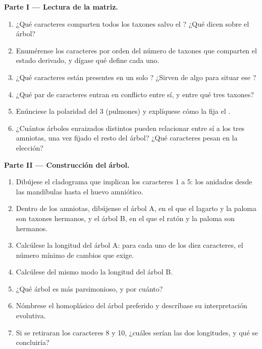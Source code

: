 \begin{problem}
\medskip
\noindent\textbf{Parte I --- Lectura de la matriz.}
\begin{enumerate}
  \item ¿Qué caracteres comparten todos los taxones salvo el ?
        ¿Qué dicen sobre el árbol?
  \item Enumérense los caracteres por orden del número de taxones que
        comparten el estado derivado, y dígase qué  define cada uno.
  \item ¿Qué caracteres están presentes en un solo ? ¿Sirven de algo
        para situar ese ?
  \item ¿Qué par de caracteres entran en conflicto entre sí, y entre qué
        tres taxones?
  \item Enúnciese la polaridad del  3 (pulmones) y explíquese cómo
        la fija el .
  \item ¿Cuántos árboles enraizados distintos pueden relacionar entre sí a
        los tres amniotas, una vez fijado el resto del árbol? ¿Qué
        caracteres pesan en la elección?
\end{enumerate}

\medskip
\noindent\textbf{Parte II --- Construcción del árbol.}
\begin{enumerate}[resume]
  \item Dibújese el cladograma que implican los caracteres 1 a 5: los 
        anidados desde las mandíbulas hasta el huevo amniótico.
  \item Dentro de los amniotas, dibújense el árbol A, en el que el lagarto y
        la paloma son taxones hermanos, y el árbol B, en el que el ratón y
        la paloma son hermanos.
  \item Calcúlese la longitud del árbol A: para cada uno de los diez
        caracteres, el número mínimo de cambios que exige.
  \item Calcúlese del mismo modo la longitud del árbol B.
  \item ¿Qué árbol es más parsimonioso, y por cuánto?
  \item Nómbrese el  homoplásico del árbol preferido y descríbase su
        interpretación evolutiva.
  \item Si se retiraran los caracteres 8 y 10, ¿cuáles serían las dos
        longitudes, y qué se concluiría?
\end{enumerate}


\end{problem}
